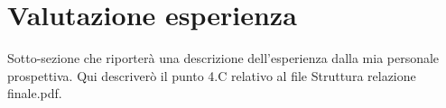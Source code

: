 \section{Valutazione esperienza}

Sotto-sezione che riporterà una descrizione dell'esperienza dalla mia personale prospettiva.
Qui descriverò il punto 4.C relativo al file Struttura relazione finale.pdf.